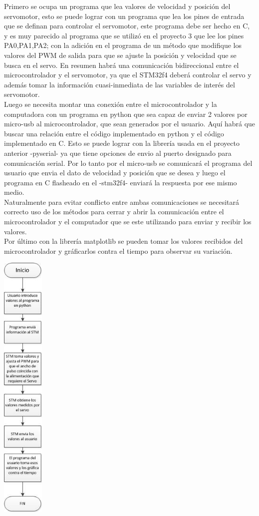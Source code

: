 \documentclass[letterpaper]{article}
\begin{document}
Primero se ocupa un programa que lea valores de velocidad y posición del servomotor, esto se puede lograr con un programa que lea los pines de entrada que se definan para controlar el servomotor, este programa debe ser hecho en C, y es muy parecido al programa que se utilizó en el proyecto 3 que lee los pines PA0,PA1,PA2; con la adición en el programa de un método que modifique los valores del PWM de salida para que se ajuste la posición y velocidad que se busca en el servo. En resumen habrá una comunicación bidireccional entre el microcontrolador y el servomotor, ya que el STM32f4 deberá controlar el servo y además tomar la información cuasi-inmediata de las variables de interés del servomotor.\\
Luego se necesita montar una conexión entre el microcontrolador y la computadora con un programa en python que sea capaz de enviar 2 valores por micro-usb al microcontrolador, que sean generados por el usuario. Aquí habrá que buscar una relación entre el código implementado en python y el código implementado en C. Esto se puede lograr con la librería usada en el proyecto anterior -pyserial- ya que tiene opciones de envio al puerto designado para comunicación serial. Por lo tanto por el micro-usb se comunicará el programa del usuario que envia el dato de velocidad y posición que se desea y luego el programa en C flasheado en el -stm32f4- enviará la respuesta por ese mismo medio.\\
Naturalmente para evitar conflicto entre ambas comunicaciones se necesitará correcto uso de los métodos para cerrar y abrir la comunicación entre el microcontrolador y el computador que se este utilizando para enviar y recibir los valores.\\
Por último con la librería matplotlib se pueden tomar los valores recibidos del microcontrolador y gráficarlos contra el tiempo para observar su variación.\\

\begin{center}
\includegraphics[width=2cm]{micro.png}
\end{center}
\end{document}
